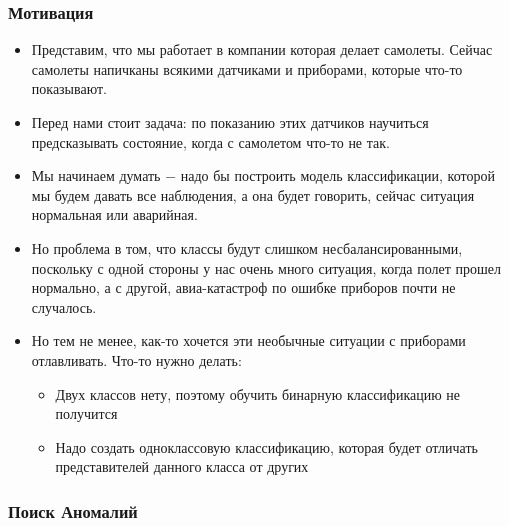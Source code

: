         \subsubsection{Мотивация}

            \begin{itemize}
                \item Представим, что мы работает в компании которая делает самолеты. Сейчас самолеты напичканы всякими датчиками и приборами, которые что-то показывают.

                \item Перед нами стоит задача: по показанию этих датчиков научиться предсказывать состояние, когда с самолетом что-то не так.

                \item Мы начинаем думать $-$ надо бы построить модель классификации, которой мы будем давать все наблюдения, а она будет говорить, сейчас ситуация нормальная или аварийная.

                \item Но проблема в том, что классы будут слишком несбалансированными, поскольку с одной стороны у нас очень много ситуация, когда полет прошел нормально, а с другой, авиа-катастроф по ошибке приборов почти не случалось. 

                \item Но тем не менее, как-то хочется эти необычные ситуации с приборами отлавливать. Что-то нужно делать:
                \begin{itemize}
                    \item Двух классов нету, поэтому обучить бинарную классификацию не получится

                    \item Надо создать одноклассовую классификацию, которая будет отличать представителей данного класса от других 
                \end{itemize}
            \end{itemize}

    \subsubsection{Поиск Аномалий}

